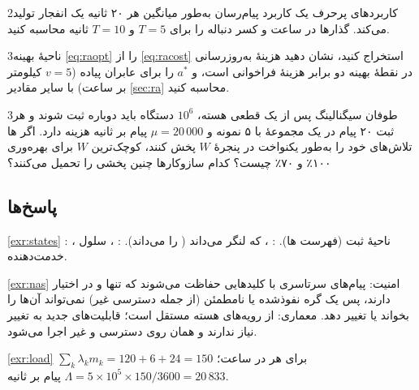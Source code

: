 \documentclass[11pt,a4paper]{article}
\begin{document}
\begin{exercisebox}{2}{کاربردهای پرحرف}\label{exr:timer}
یک کاربرد پیام‌رسان به‌طور میانگین هر ۲۰ ثانیه یک انفجار تولید می‌کند. گذارها در ساعت و کسر دنباله را برای $T = 5$ و $T = 10$ ثانیه محاسبه کنید.
\end{exercisebox}

\begin{exercisebox}{3}{ناحیهٔ بهینه}\label{exr:ra}
\cref{eq:raopt} را از \cref{eq:racost} استخراج کنید، نشان دهید هزینهٔ به‌روزرسانی در نقطهٔ بهینه دو برابر هزینهٔ فراخوانی است، و $a^{*}$ را برای عابران پیاده
($v = 5$ کیلومتر بر ساعت) با سایر مقادیر \cref{sec:ra} محاسبه کنید.
\end{exercisebox}

\begin{exercisebox}{3}{طوفان سیگنالینگ}\label{exr:storm}
پس از یک قطعی هسته، $10^{6}$ دستگاه  باید دوباره ثبت شوند و هر ثبت ۲۰ پیام در یک مجموعهٔ  با ۵ نمونه و $\mu = 20\,000$ پیام بر ثانیه هزینه
دارد. اگر ها تلاش‌های خود را به‌طور یکنواخت در پنجرهٔ $W$ پخش کنند، کوچک‌ترین $W$ برای بهره‌وری ۱۰۰٪ و ۷۰٪ چیست؟ کدام سازوکارها چنین پخشی را
تحمیل می‌کنند؟
\end{exercisebox}

\subsection*{پاسخ‌ها}

\begin{solutionbox}{\ref{exr:states}}
: ، ناحیهٔ ثبت (فهرست ها). : ،  که  لنگر می‌داند (  را
می‌داند). : ، سلول خدمت‌دهنده.
\end{solutionbox}

\begin{solutionbox}{\ref{exr:nas}}
امنیت: پیام‌های  سرتاسری با کلیدهایی حفاظت می‌شوند که تنها  و  در اختیار دارند، پس یک گره  نفوذشده یا نامطمئن
(از جمله دسترسی غیر) نمی‌تواند آن‌ها را بخواند یا تغییر دهد. معماری:  از رویه‌های هسته مستقل است؛ قابلیت‌های جدید  به تغییر
 نیاز ندارند و همان  روی دسترسی  و غیر اجرا می‌شود.
\end{solutionbox}

\begin{solutionbox}{\ref{exr:load}}
$\sum_k \lambda_k m_k = 120 + 6 + 24 = 150$ برای هر  در ساعت؛ $\Lambda = 5\times10^5\times150/3600 = 20\,833$ پیام بر ثانیه.
\end{solutionbox}
\end{document}
